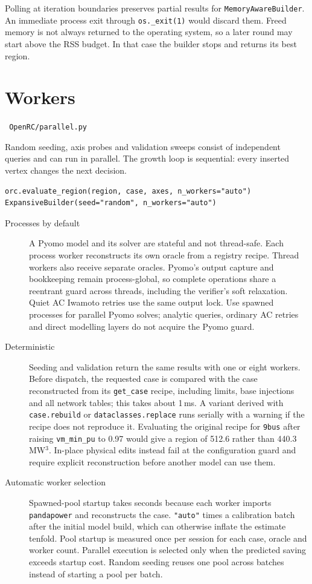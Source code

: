 \documentclass[11pt,a4paper]{report}
\newcommand{\why}[1]{\par\medskip\begingroup\noindent #1\par\endgroup\medskip}
\newcommand{\code}[1]{\texttt{\small #1}}
\newcommand{\file}[1]{\texttt{\small\color{nbgrey} #1}}
\begin{document}
\why{Polling at iteration boundaries preserves partial results for
\code{MemoryAwareBuilder}. An immediate process exit through
\code{os.\_exit(1)} would discard them. Freed memory is not always returned to
the operating system, so a later round may start above the RSS budget. In that
case the builder stops and returns its best region.}

\section{Workers}
\label{sec:workers}

\file{OpenRC/parallel.py}

Random seeding, axis probes and validation sweeps consist of independent
queries and can run in parallel. The growth loop is sequential: every inserted
vertex changes the next decision.

\begin{lstlisting}
orc.evaluate_region(region, case, axes, n_workers="auto")
ExpansiveBuilder(seed="random", n_workers="auto")
\end{lstlisting}

\begin{description}
\item[Processes by default] A Pyomo model and its solver are stateful and not
  thread-safe. Each process worker reconstructs its own oracle from a registry
  recipe. Thread workers also receive separate oracles. Pyomo's output capture
  and bookkeeping remain process-global, so complete operations share a reentrant
  guard across threads, including the verifier's soft relaxation. Quiet AC
  Iwamoto retries use the same output lock. Use spawned processes for parallel
  Pyomo solves; analytic queries, ordinary AC retries and direct modelling
  layers do not acquire the Pyomo guard.
\item[Deterministic] Seeding and validation return the same results with one
  or eight workers. Before dispatch, the requested case is compared with the
  case reconstructed from its \code{get\_case} recipe, including limits, base
  injections and all network tables; this takes about 1\,ms. A variant derived
  with \code{case.rebuild} or \code{dataclasses.replace} runs serially with a
  warning if the recipe does not reproduce it. Evaluating the original recipe
  for \code{9bus} after raising \code{vm\_min\_pu} to 0.97 would give a region
  of 512.6 rather than 440.3\,MW$^3$.
  In-place physical edits instead fail at the configuration guard and require
  explicit reconstruction before another model can use them.
\item[Automatic worker selection] Spawned-pool startup takes seconds because
  each worker imports \code{pandapower} and reconstructs the case.
  \code{"auto"} times a calibration batch after the initial model build,
  which can otherwise inflate the estimate tenfold. Pool startup is measured
  once per session for each case, oracle and worker count. Parallel execution
  is selected only when the predicted saving exceeds startup cost. Random
  seeding reuses one pool across batches instead of starting a pool per batch.
\end{description}
\end{document}
